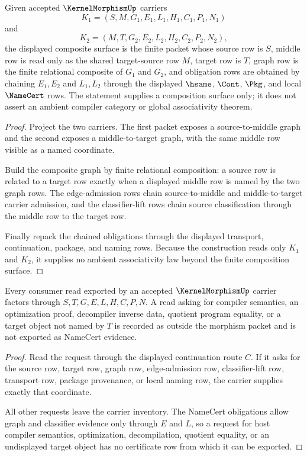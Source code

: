 \begin{theorem}
\label{thm:kernel-morphism-composition-surface}
Given accepted $\KernelMorphismUp$ carriers
$$
K_{1}=(S,M,G_{1},E_{1},L_{1},H_{1},C_{1},P_{1},N_{1})
$$
and
$$
K_{2}=(M,T,G_{2},E_{2},L_{2},H_{2},C_{2},P_{2},N_{2}),
$$
the displayed composite surface is the finite packet whose source row is $S$, middle row is read only as the shared target-source row $M$, target row is $T$, graph row is the finite relational composite of $G_{1}$ and $G_{2}$, and obligation rows are obtained by chaining $E_{1},E_{2}$ and $L_{1},L_{2}$ through the displayed $\hsame$, $\Cont$, $\Pkg$, and local $\NameCert$ rows. The statement supplies a composition surface only; it does not assert an ambient compiler category or global associativity theorem.
\end{theorem}
\begin{proof}
Project the two carriers. The first packet exposes a source-to-middle graph and the second exposes a middle-to-target graph, with the same middle row visible as a named coordinate.

Build the composite graph by finite relational composition: a source row is related to a target row exactly when a displayed middle row is named by the two graph rows. The edge-admission rows chain source-to-middle and middle-to-target carrier admission, and the classifier-lift rows chain source classification through the middle row to the target row.

Finally repack the chained obligations through the displayed transport, continuation, package, and naming rows. Because the construction reads only $K_{1}$ and $K_{2}$, it supplies no ambient associativity law beyond the finite composition surface.
\end{proof}

\begin{theorem}
\label{thm:kernel-morphism-non-escape}
Every consumer read exported by an accepted $\KernelMorphismUp$ carrier factors through $S,T,G,E,L,H,C,P,N$. A read asking for compiler semantics, an optimization proof, decompiler inverse data, quotient program equality, or a target object not named by $T$ is recorded as outside the morphism packet and is not exported as NameCert evidence.
\end{theorem}
\begin{proof}
Read the request through the displayed continuation route $C$. If it asks for the source row, target row, graph row, edge-admission row, classifier-lift row, transport row, package provenance, or local naming row, the carrier supplies exactly that coordinate.

All other requests leave the carrier inventory. The NameCert obligations allow graph and classifier evidence only through $E$ and $L$, so a request for host compiler semantics, optimization, decompilation, quotient equality, or an undisplayed target object has no certificate row from which it can be exported.
\end{proof}

